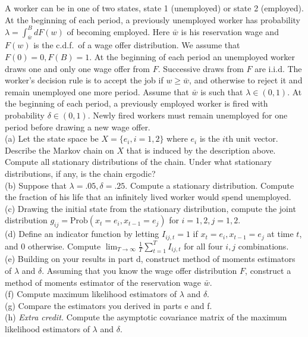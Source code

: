 \documentclass[12pt, letterpaper]{article}
\begin{document}
\begin{tcolorbox}[oddbox,title={Exercise 2.17 \quad Lake Model}]
\begin{tcolorbox}[questionbox]
A worker can be in one of two states, state 1 (unemployed) or state 2 (employed). At the beginning
of each period, a previously unemployed worker has probability $\lambda=\int_{\bar w}^BdF(w)$ of
becoming employed. Here $\bar w$ is his reservation wage and $F(w)$ is the c.d.f.\ of a wage offer
distribution. We assume that $F(0)=0,F(B)=1$. At the beginning of each period an unemployed worker
draws one and only one wage offer from $F$. Successive draws from $F$ are i.i.d. The worker's
decision rule is to accept the job if $w\ge\bar w$, and otherwise to reject it and remain
unemployed one more period. Assume that $\bar w$ is such that $\lambda\in(0,1)$. At the beginning of
each period, a previously employed worker is fired with probability $\delta\in(0,1)$. Newly fired
workers must remain unemployed for one period before drawing a new wage offer.\\[3pt]
(a) Let the state space be $X=\{e_i,i=1,2\}$ where $e_i$ is the $i$th unit vector. Describe the
Markov chain on $X$ that is induced by the description above. Compute all stationary distributions
of the chain. Under what stationary distributions, if any, is the chain ergodic?\\
(b) Suppose that $\lambda=.05,\delta=.25$. Compute a stationary distribution. Compute the fraction
of his life that an infinitely lived worker would spend unemployed.\\
(c) Drawing the initial state from the stationary distribution, compute the joint distribution
$g_{ij}=\text{Prob}(x_t=e_i,x_{t-1}=e_j)$ for $i=1,2,j=1,2$.\\
(d) Define an indicator function by letting $I_{ij,t}=1$ if $x_t=e_i,x_{t-1}=e_j$ at time $t$, and 0
otherwise. Compute $\lim_{T\to\infty}\frac1T\sum_{t=1}^TI_{ij,t}$ for all four $i,j$ combinations.\\
(e) Building on your results in part d, construct method of moments estimators of $\lambda$ and
$\delta$. Assuming that you know the wage offer distribution $F$, construct a method of moments
estimator of the reservation wage $\bar w$.\\
(f) Compute maximum likelihood estimators of $\lambda$ and $\delta$.\\
(g) Compare the estimators you derived in parts e and f.\\
(h) \textit{Extra credit.} Compute the asymptotic covariance matrix of the maximum likelihood
estimators of $\lambda$ and $\delta$.
\end{tcolorbox}


\end{tcolorbox}
\end{document}
